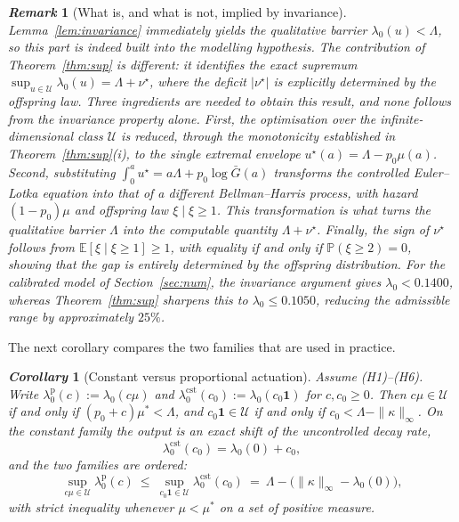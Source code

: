 \documentclass[letterpaper, 10pt, conference]{ieeeconf}
\newtheorem{remark}{\it \textbf{Remark}}
\newtheorem{corollary}{\it \textbf{Corollary}}
\newcommand{\E}{\mathbb{E}}
\newcommand{\calU}{\mathcal{U}}
\newcommand{\Lbar}{\Lambda}
\newcommand{\rev}[1]{#1}
\newcommand{\ed}[1]{#1}
\begin{document}
\begin{remark}[\rev{What is, and what is not, implied by invariance}]
\label{rem:nontrivial}
\rev{Lemma~\ref{lem:invariance} immediately yields the qualitative barrier
$\lambda_0(u)<\Lbar$, so this part is indeed built into the modelling
hypothesis. The contribution of Theorem~\ref{thm:sup} is different: it
identifies the exact supremum $\sup_{u\in\calU}\lambda_0(u)=\Lbar+\nu^\star$,
where the deficit $|\nu^\star|$ is explicitly determined by the offspring law. Three ingredients are needed to obtain this result, and none follows from the invariance property alone. First, the optimisation over the infinite-dimensional
class $\calU$ is reduced, through the monotonicity established in Theorem~\ref{thm:sup}(i), to the single extremal envelope
$u^\star(a)=\Lbar-p_0\mu(a)$. Second, substituting
$\int_0^au^\star=a\Lbar+p_0\log\bar G(a)$ transforms the controlled
Euler--Lotka equation into that of a different Bellman--Harris process, with
hazard $(1-p_0)\mu$ and offspring law $\xi\mid\xi\ge1$. This transformation is
what turns the qualitative barrier $\Lbar$ into the computable quantity
$\Lbar+\nu^\star$. Finally, the sign of $\nu^\star$ follows from
$\E[\xi\mid\xi\ge1]\ge1$, with equality if and only if
$\mathbb P(\xi\ge2)=0$, showing that the gap is entirely determined by the
offspring distribution. For the calibrated model of Section~\ref{sec:num}, the invariance argument
gives $\lambda_0<0.1400$, whereas Theorem~\ref{thm:sup} sharpens this to
$\lambda_0\le0.1050$, reducing the admissible range by approximately $25\%$.}
\end{remark}
\rev{The next corollary compares the two families that are used in practice.}
\begin{corollary}[\rev{Constant versus proportional actuation}]
\label{cor:shape}
\ed{Assume {\rm(H1)--(H6)}.}
\rev{Write $\lambda_0^{\mathrm p}(c):=\lambda_0(c\mu)$ and
$\lambda_0^{\mathrm{cst}}(c_0):=\lambda_0(c_0\mathbf 1)$ for $c,c_0\ge0$. Then
$c\mu\in\calU$ if and only if $(p_0+c)\mu^\ast<\Lbar$, and
$c_0\mathbf 1\in\calU$ if and only if $c_0<\Lbar-\|\kappa\|_\infty$. On the
constant family the output is an exact shift of the uncontrolled decay rate,}
\begin{equation}
\lambda_0^{\mathrm{cst}}(c_0)=\lambda_0(0)+c_0 ,
\label{eq:shift}
\end{equation}
\rev{and the two families are ordered:}
\begin{equation}
\sup_{c\mu\in\calU}\lambda_0^{\mathrm p}(c)
\ \le\
\sup_{c_0\mathbf 1\in\calU}\lambda_0^{\mathrm{cst}}(c_0)
\ =\ \Lbar-\bigl(\|\kappa\|_\infty-\lambda_0(0)\bigr),
\label{eq:order}
\end{equation}
\rev{with strict inequality whenever $\mu<\mu^\ast$ on a set of positive
measure.}
\end{corollary}
\end{document}
